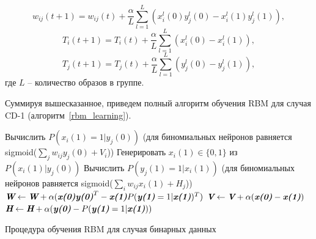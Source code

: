 \begin{equation*}
		w_{ij}(t+1)=w_{ij}(t)+\frac{\alpha}{L}\sum_{l=1}^L(x_i^l(0)y_j^l(0)-x_i^l(1)y_j^l(1)),
\end{equation*}
\begin{equation*}		
		T_i(t+1)=T_i(t)+\frac{\alpha}{L}\sum_{l=1}^L(x_i^l(0)-x_i^l(1)),
\end{equation*}
\begin{equation*}		
		T_j(t+1)=T_j(t)+\frac{\alpha}{L}\sum_{l=1}^L(y_j^l(0)-y_j^l(1)),
\end{equation*}	
где $L$ -- количество образов в группе.
	
Суммируя вышесказанное, приведем полный алгоритм обучения RBM для случая CD-1 (алгоритм~\ref{rbm_learning}).

\begin{algo}[h]
	
	{
		Вычислить $P(x_{i}(1)=1|y_j(0))$ (для биномиальных нейронов равняется sigmoid($\sum_{j}{w_{ij}y_{j}(0)} + V_i$))\;
		Генерировать $x_{i}(1) \in \{0, 1\}$ из $P(x_{i}(1)|y_j(0))$\;
	}	
	{
		Вычислить $P(y_{j}(1)=1|x_i(1))$ (для биномиальных нейронов равняется sigmoid($\sum_{i}{w_{ij}x_{i}(1)} + H_j$))\;
	}
	$\textit{\textbf{W}} \leftarrow \textit{\textbf{W}} + \alpha(\textbf{\textit{x(0)}}\textit{\textbf{y(0)}}^T - \textit{\textbf{x(1)}}P(\textit{\textbf{y(1)}}=1|\textit{\textbf{x(1)}})^T)$\;
	$\textit{\textbf{V}} \leftarrow \textit{\textbf{V}} + \alpha(\textit{\textbf{x(0)}} - \textit{\textbf{x(1)}})$\;
	$\textit{\textbf{H}} \leftarrow \textit{\textbf{H}} + \alpha(\textit{\textbf{y(0)}} - P(\textit{\textbf{y(1)}}=1|\textit{\textbf{x(1)}}))$\;
    \caption{Процедура обучения RBM для случая бинарных данных}
	\label{rbm_learning}
\end{algo}

